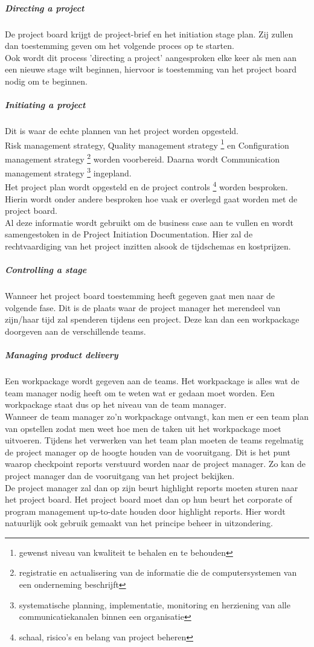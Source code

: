 \documentclass[]{article}
\begin{document}
\subparagraph{Directing a project}
De project board krijgt de project-brief en het initiation stage plan. Zij zullen dan toestemming geven om het volgende proces op te starten.\\
Ook wordt dit process 'directing a project' aangesproken elke keer als men aan een nieuwe stage wilt beginnen, hiervoor is toestemming van het project board nodig om te beginnen.

\subparagraph{Initiating a project}
Dit is waar de echte plannen van het project worden opgesteld.\\
Risk management strategy, Quality management strategy \footnote{gewenst niveau van kwaliteit te behalen en te behouden} en Configuration management strategy \footnote{registratie en actualisering van de informatie die de computersystemen van een onderneming beschrijft} worden voorbereid. Daarna wordt Communication management strategy \footnote{
	systematische planning, implementatie, monitoring en herziening van alle communicatiekanalen binnen een organisatie} ingepland.\\
Het project plan wordt opgesteld en de project controls \footnote{schaal, risico's en belang van project beheren} worden besproken. Hierin wordt onder andere besproken hoe vaak er overlegd gaat worden met de project board.\\
Al deze informatie wordt gebruikt om de business case aan te vullen en wordt samengestoken in de Project Initiation Documentation. Hier zal de rechtvaardiging van het project inzitten alsook de tijdschemas en kostprijzen.

\subparagraph{Controlling a stage}
Wanneer het project board toestemming heeft gegeven gaat men naar de volgende fase. Dit is de plaats waar de project manager het merendeel van zijn/haar tijd zal spenderen tijdens een project. Deze kan dan een workpackage doorgeven aan de verschillende teams.

\subparagraph{Managing product delivery}
Een workpackage wordt gegeven aan de teams. Het workpackage is alles wat de team manager nodig heeft om te weten wat er gedaan moet worden. Een workpackage staat dus op het niveau van de team manager. \\
Wanneer de team manager zo’n workpackage ontvangt, kan men er een team plan van opstellen zodat men weet hoe men de taken uit het workpackage moet uitvoeren. Tijdens het verwerken van het team plan moeten de teams regelmatig de project manager op de hoogte houden van de vooruitgang. Dit is het punt waarop checkpoint reports verstuurd worden naar de project manager. Zo kan de project manager dan de vooruitgang van het project bekijken. \\
De project manager zal dan op zijn beurt highlight reports moeten sturen naar het project board. Het project board moet dan op hun beurt het corporate of program management up-to-date houden door highlight reports. Hier wordt natuurlijk ook gebruik gemaakt van het principe beheer in uitzondering.
\end{document}
